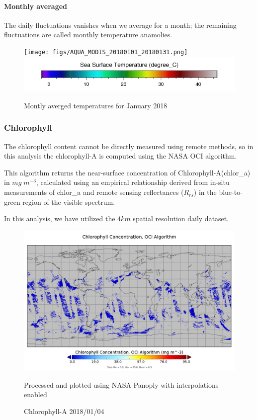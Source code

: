     \paragraph{Monthly averaged}
        The daily fluctuations vanishes when we average for a month; the remaining fluctuations are called monthly temperature anamolies.

        \begin{figure}[H]
            \centering
            \texttt{[image: figs/AQUA\_MODIS\_20180101\_20180131.png]}
            \includegraphics[scale=0.4]{figs/sst_colorbar.png}
            \caption{Montly averged temperatures for January 2018}
        \end{figure}
    
    \subsubsection{Chlorophyll} The chlorophyll content cannot be directly measured using remote methods, so in this analysis the chlorophyll-A is computed using the NASA OCI algorithm.

    This algorithm returns the near-surface concentration of Chlorophyll-A(chlor\_a) in $mg\; m^{-3}$, calculated using an empirical relationship derived from in-situ measurements of chlor\_a and remote sensing reflectances ($R_{rs}$) in the blue-to-green region of the visible spectrum.

    In this analysis, we have utilized the $4km$ spatial resolution daily dataset.

    \begin{figure}[H]
        \centering
        \includegraphics[width=14cm, trim={{0cm} {0.5cm} {0cm} {0cm}}, clip]{figs/chlor_a_in_A2018004.png}
        \caption{Chlorophyll-A 2018/01/04}
        {\footnotesize Processed and plotted using NASA Panoply with interpolations enabled}
    \end{figure}
    
